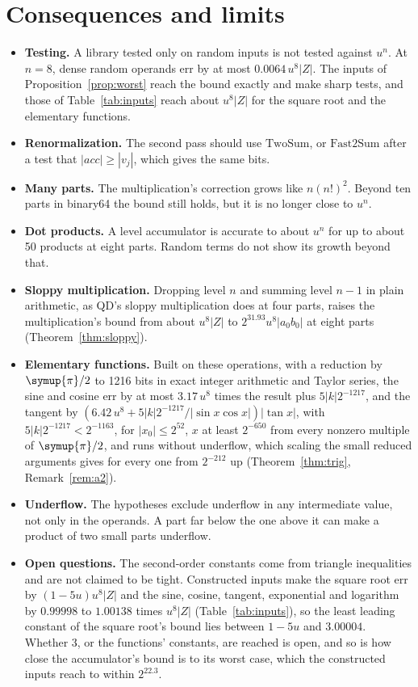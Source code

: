 \documentclass[conference]{IEEEtran}
\theoremstyle{definition}
\theoremstyle{remark}
\newcommand{\acc}{\mathit{acc}}
\newcommand{\TwoSum}{\mathrm{TwoSum}}
\newcommand{\FastTwoSum}{\mathrm{Fast2Sum}}
\newcommand{\cpi}{\symup{\pi}}
\begin{document}
\section{Consequences and limits}

\begin{itemize}
\item \textbf{Testing.} A library tested only on random inputs is not tested against $u^n$. At $n = 8$, dense random
  operands err by at most $0.0064\,u^8|Z|$. The inputs of Proposition~\ref{prop:worst} reach the bound exactly and make sharp
  tests, and those of Table~\ref{tab:inputs} reach about $u^8|Z|$ for the square root and the elementary functions.
\item \textbf{Renormalization.} The second pass should use $\TwoSum$, or $\FastTwoSum$ after a test that
  $|\acc| \ge |v_j|$, which gives the same bits.
\item \textbf{Many parts.} The multiplication's correction grows like $n(n!)^2$. Beyond ten parts in binary64 the
  bound still holds, but it is no longer close to $u^n$.
\item \textbf{Dot products.} A level accumulator is accurate to about $u^n$ for up to about 50 products at eight
  parts. Random terms do not show its growth beyond that.
\item \textbf{Sloppy multiplication.} Dropping level $n$ and summing level $n - 1$ in plain arithmetic, as QD's
  sloppy multiplication does at four parts, raises the multiplication's bound from about $u^8|Z|$ to
  $2^{31.93}u^8|a_0b_0|$ at eight parts (Theorem~\ref{thm:sloppy}).
\item \textbf{Elementary functions.} Built on these operations, with a reduction by $\cpi/2$ to 1216 bits in exact
  integer arithmetic and Taylor series, the sine and cosine err by at most $3.17\,u^8$ times the result plus $5|k|2^{-1217}$, and the
  tangent by $(6.42\,u^8 + 5|k|2^{-1217}/|\sin x\cos x|)|\tan x|$, with $5|k|2^{-1217} < 2^{-1163}$, for $|x_0| \le
  2^{52}$, $x$ at least $2^{-650}$ from every nonzero multiple of $\cpi/2$, and runs without underflow, which scaling
  the small reduced arguments gives for every one from $2^{-212}$ up (Theorem~\ref{thm:trig}, Remark~\ref{rem:a2}).
\item \textbf{Underflow.} The hypotheses exclude underflow in any intermediate value, not only in the operands. A part
  far below the one above it can make a product of two small parts underflow.
\item \textbf{Open questions.} The second-order constants come from triangle inequalities and are not claimed to be
  tight. Constructed inputs make the square root err by $(1 - 5u)u^8|Z|$ and the sine, cosine, tangent, exponential
  and logarithm by $0.99998$ to $1.00138$ times $u^8|Z|$ (Table~\ref{tab:inputs}), so the least leading constant of the
  square root's bound lies between $1 - 5u$ and $3.00004$. Whether 3, or the functions' constants, are reached is open,
  and so is how close the accumulator's bound is to its worst case, which the constructed inputs reach to within
  $2^{22.3}$.
\end{itemize}
\end{document}
